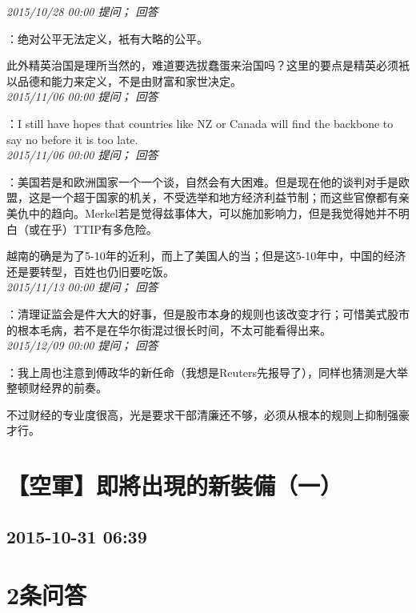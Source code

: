 \documentclass[twocolumn]{ctexart}
\begin{document}
\textit{\hfill\noindent\small 2015/10/28 00:00 提问； 回答}

：绝对公平无法定义，衹有大略的公平。

此外精英治国是理所当然的，难道要选拔蠢蛋来治国吗？这里的要点是精英必须衹以品德和能力来定义，不是由财富和家世决定。\\

\textit{\hfill\noindent\small 2015/11/06 00:00 提问； 回答}

：I still have hopes that countries like NZ or Canada will find the backbone to say no before it is too late.\\

\textit{\hfill\noindent\small 2015/11/06 00:00 提问； 回答}

：美国若是和欧洲国家一个一个谈，自然会有大困难。但是现在他的谈判对手是欧盟，这是一个超于国家的机关，不受选举和地方经济利益节制；而这些官僚都有亲美仇中的趋向。Merkel若是觉得兹事体大，可以施加影响力，但是我觉得她并不明白（或在乎）TTIP有多危险。

越南的确是为了5-10年的近利，而上了美国人的当；但是这5-10年中，中国的经济还是要转型，百姓也仍旧要吃饭。\\

\textit{\hfill\noindent\small 2015/11/13 00:00 提问； 回答}

：清理证监会是件大大的好事，但是股市本身的规则也该改变才行；可惜美式股市的根本毛病，若不是在华尔街混过很长时间，不太可能看得出来。\\

\textit{\hfill\noindent\small 2015/12/09 00:00 提问； 回答}

：我上周也注意到傅政华的新任命（我想是Reuters先报导了），同样也猜测是大举整顿财经界的前奏。

不过财经的专业度很高，光是要求干部清廉还不够，必须从根本的规则上抑制强豪才行。\\


\section{【空軍】即將出現的新裝備（一）}
\subsection{2015-10-31 06:39}


\section{2条问答}
\end{document}
